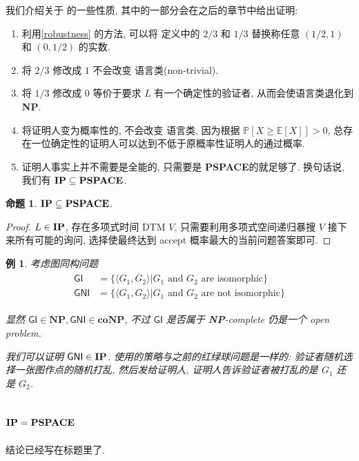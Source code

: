 \documentclass[8pt]{article}
\theoremstyle{compact}
\newtheorem{proposition}[theorem]{命题}
\newtheorem{example}[theorem]{例}
\def\ge{\geqslant}
\def\NP{\textbf{NP}}
\def\coNP{\textbf{coNP}}
\def\PSPACE{\textbf{PSPACE}}
\begin{document}
我们介绍关于 \IP 的一些性质, 其中的一部分会在之后的章节中给出证明:
\begin{enumerate}
	\item 利用\cref{robustness} 的方法, 可以将 \IP 定义中的 $2/3$ 和 $1/3$ 替换称任意 $(1/2, 1)$ 和 $(0, 1/2)$ 的实数.
	\item 将 $2/3$ 修改成 $1$ 不会改变 \IP 语言类(non-trivial).
	\item 将 $1/3$ 修改成 $0$ 等价于要求 $L$ 有一个确定性的验证者, 从而会使语言类退化到 \NP.
 \item 将证明人变为概率性的, 不会改变 \IP 语言类, 因为根据 $\mathbb P[X \ge \mathbb E[X]] > 0$, 总存在一位确定性的证明人可以达到不低于原概率性证明人的通过概率.
 \item 证明人事实上并不需要是全能的, 只需要是 \PSPACE 的就足够了. 换句话说, 我们有 $\IP \subseteq \PSPACE$.
\end{enumerate}

\begin{proposition}
	$\IP \subseteq \PSPACE$.
\end{proposition}
\begin{proof}
	$L \in \textbf{IP}$, 存在多项式时间 DTM $V$, 只需要利用多项式空间递归暴搜 $V$ 接下来所有可能的询问, 选择使最终达到 accept 概率最大的当前问题答案即可.
\end{proof}

\begin{example} 考虑图同构问题
\begin{align*}
	\begin{split}
		\textsf{GI} &= \{\langle G_1, G_2 \rangle | G_1 \text{ and } G_2 \text{ are isomorphic}\} \\
		\textsf{GNI} &= \{\langle G_1, G_2 \rangle | G_1 \text{ and } G_2 \text{ are not isomorphic}\}
	\end{split}
\end{align*}

显然 $\textsf{GI} \in \NP, \textsf{GNI} \in \coNP$, 不过 $\textsf{GI}$ 是否属于 \NP-complete 仍是一个 open problem.

我们可以证明 $\textsf{GNI} \in \textbf{IP}$. 使用的策略与之前的红绿球问题是一样的: 验证者随机选择一张图作点的随机打乱, 然后发给证明人, 证明人告诉验证者被打乱的是 $G_1$ 还是 $G_2$.

\end{example}

\subsection{$\IP = \PSPACE$}
结论已经写在标题里了.
\end{document}
